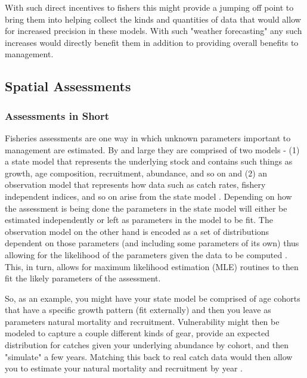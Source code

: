 \documentclass[11pt]{article}
\begin{document}
With such direct incentives to fishers this might provide a jumping off point to bring them into helping collect the kinds and quantities of data that would allow for increased precision in these models. With such "weather forecasting" any such increases would directly benefit them in addition to providing overall benefits to management. 

\newpage


\subsection{Spatial Assessments}\label{spatial_assessments}

\subsubsection{Assessments in Short}

Fisheries assessments are one way in which unknown parameters important to management are estimated. By and large they are comprised of two models - (1) a state model that represents the underlying stock and contains such things as growth, age composition, recruitment, abundance, and so on and (2) an observation model that represents how data such as catch rates, fishery independent indices, and so on arise from the state model \citep{king}. Depending on how the assessment is being done the parameters in the state model will either be estimated independently or left as parameters in the model to be fit. The observation model on the other hand is encoded as a set of distributions dependent on those parameters (and including some parameters of its own) thus allowing for the likelihood of the parameters given the data to be computed \citep{sippel2014}. This, in turn, allows for maximum likelihood estimation (MLE) routines to then fit the likely parameters of the assessment. \newline

So, as an example, you might have your state model be comprised of age cohorts that have a specific growth pattern (fit externally) and then you leave as parameters natural mortality and recruitment. Vulnerability might then be modeled to capture a couple different kinds of gear, provide an expected distribution for catches given your underlying abundance by cohort, and then "simulate" a few years. Matching this back to real catch data would then allow you to estimate your natural mortality and recruitment by year \citep{king} \citep{ASAP}. \newline
\end{document}
